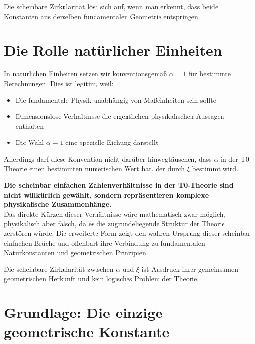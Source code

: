 \documentclass[12pt,a4paper]{article}
\begin{document}
Die scheinbare Zirkularität löst sich auf, wenn man erkennt, dass beide Konstanten aus derselben fundamentalen Geometrie entspringen.

\section{Die Rolle natürlicher Einheiten}
\label{sec:einheiten}

In natürlichen Einheiten setzen wir konventionsgemäß $\alpha = 1$ für bestimmte Berechnungen. Dies ist legitim, weil:

\begin{itemize}
	\item Die fundamentale Physik unabhängig von Maßeinheiten sein sollte
	\item Dimensionslose Verhältnisse die eigentlichen physikalischen Aussagen enthalten
	\item Die Wahl $\alpha = 1$ eine spezielle Eichung darstellt
\end{itemize}

Allerdings darf diese Konvention nicht darüber hinwegtäuschen, dass $\alpha$ in der T0-Theorie einen bestimmten numerischen Wert hat, der durch $\xi$ bestimmt wird.



\begin{tcolorbox}[colback=blue!5!white,colframe=blue!75!black]
	\textbf{Die scheinbar einfachen Zahlenverhältnisse in der T0-Theorie sind nicht willkürlich gewählt, sondern repräsentieren komplexe physikalische Zusammenhänge.} \\
	
	Das direkte Kürzen dieser Verhältnisse wäre mathematisch zwar möglich, physikalisch aber falsch, da es die zugrundeliegende Struktur der Theorie zerstören würde. Die erweiterte Form zeigt den wahren Ursprung dieser scheinbar einfachen Brüche und offenbart ihre Verbindung zu fundamentalen Naturkonstanten und geometrischen Prinzipien.
	
	Die scheinbare Zirkularität zwischen $\alpha$ und $\xi$ ist Ausdruck ihrer gemeinsamen geometrischen Herkunft und kein logisches Problem der Theorie.
\end{tcolorbox}


	
	\section{Grundlage: Die einzige geometrische Konstante}
	
\end{document}
